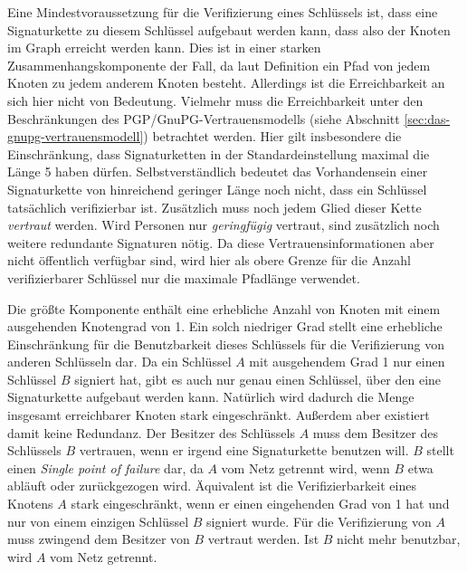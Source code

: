 Eine Mindestvoraussetzung für die Verifizierung eines Schlüssels
ist, dass eine Signaturkette zu diesem Schlüssel aufgebaut werden
kann, dass also der Knoten im Graph erreicht werden kann. Dies ist in
einer starken Zusammenhangskomponente der Fall, da laut Definition ein
Pfad von jedem Knoten zu jedem anderem Knoten besteht. Allerdings ist
die Erreichbarkeit an sich hier nicht von Bedeutung. Vielmehr muss die
Erreichbarkeit unter den Beschränkungen des
PGP/GnuPG-Vertrauensmodells (siehe Abschnitt
\ref{sec:das-gnupg-vertrauensmodell}) betrachtet werden. Hier gilt
insbesondere die Einschränkung, dass Signaturketten in der
Standardeinstellung maximal die Länge 5 haben
dürfen. Selbstverständlich bedeutet das Vorhandensein einer
Signaturkette von hinreichend geringer Länge noch nicht, dass ein
Schlüssel tatsächlich verifizierbar ist. Zusätzlich muss noch
jedem Glied dieser Kette \emph{vertraut} werden. Wird Personen nur
\emph{geringfügig} vertraut, sind zusätzlich noch weitere
redundante Signaturen nötig. Da diese Vertrauensinformationen aber
nicht öffentlich verfügbar sind, wird hier als obere Grenze für
die Anzahl verifizierbarer Schlüssel nur die maximale Pfadlänge
verwendet.

Die größte Komponente enthält eine erhebliche Anzahl von Knoten
mit einem ausgehenden Knotengrad von 1. Ein solch niedriger Grad
stellt eine erhebliche Einschränkung für die Benutzbarkeit dieses
Schlüssels für die Verifizierung von anderen Schlüsseln dar. Da
ein Schlüssel $A$ mit ausgehendem Grad 1 nur einen Schlüssel $B$
signiert hat, gibt es auch nur genau einen Schlüssel, über den
eine Signaturkette aufgebaut werden kann. Natürlich wird dadurch die
Menge insgesamt erreichbarer Knoten stark eingeschränkt. Außerdem
aber existiert damit keine Redundanz. Der Besitzer des Schlüssels
$A$ muss dem Besitzer des Schlüssels $B$ vertrauen, wenn er irgend
eine Signaturkette benutzen will. $B$ stellt einen \emph{Single point
  of failure} dar, da $A$ vom Netz getrennt wird, wenn $B$ etwa
abläuft oder zurückgezogen wird. Äquivalent ist die
Verifizierbarkeit eines Knotens $A$ stark eingeschränkt, wenn er
einen eingehenden Grad von 1 hat und nur von einem einzigen
Schlüssel $B$ signiert wurde. Für die Verifizierung von $A$ muss
zwingend dem Besitzer von $B$ vertraut werden. Ist $B$ nicht mehr
benutzbar, wird $A$ vom Netz getrennt.

